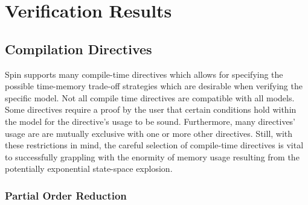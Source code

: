 \hypertarget{verification-results}{%
\chapter{Verification Results}\label{verification-results}}

\hypertarget{compilation-directives}{%
\section{Compilation Directives}\label{compilation-directives}}

Spin supports many compile-time directives which allows for specifying the possible time-memory trade-off strategies which are desirable when verifying the specific model.
Not all compile time directives are compatible with all models.
Some directives require a proof by the user that certain conditions hold within the model for the directive's usage to be sound.
Furthermore, many directives' usage are are mutually exclusive with one or more other directives.
Still, with these restrictions in mind, the careful selection of compile-time directives is vital to successfully grappling with the enormity of memory usage resulting from the potentially exponential state-space explosion.

\hypertarget{partial-order-reduction}{%
\subsection{Partial Order Reduction}\label{partial-order-reduction}}

